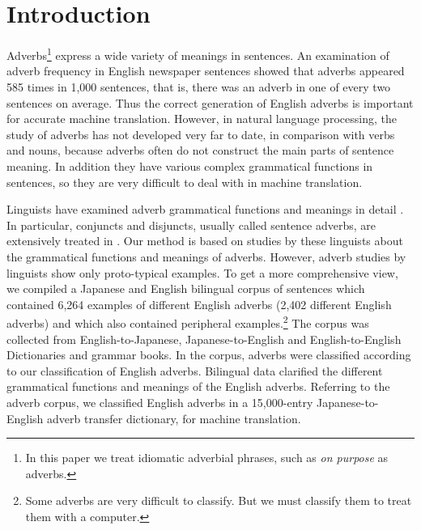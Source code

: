 

\maketitle 


\section{Introduction}
\label{sec:intr}

Adverbs\footnote{In this paper we treat idiomatic adverbial phrases,
  such as {\em on purpose} as adverbs.} express a wide variety of
meanings in sentences. An examination of adverb frequency in English
newspaper sentences showed that adverbs appeared 585 times in 1,000
sentences, that is, there was an adverb in one of every two sentences
on average.  Thus the correct generation of English adverbs is
important for accurate machine translation.  However, in natural
language processing, the study of adverbs has not developed very far
to date, in comparison with verbs and nouns, because adverbs often do not
construct the main parts of sentence meaning.
In addition they have various complex grammatical functions in
sentences, so they are very difficult to deal with in machine
translation.

Linguists have examined adverb grammatical functions and meanings in
detail \cite{Quirk:85,Otsuka:82,Rivero:92}.  In particular, conjuncts
and disjuncts, usually called sentence adverbs, are extensively
treated in .  Our method is based on studies by these
linguists about the grammatical functions and meanings of adverbs.
However, adverb studies by linguists show only proto-typical examples.
To get a more comprehensive view, we compiled a Japanese and English
bilingual corpus of sentences which contained 6,264 examples of
different English adverbs (2,402 different English adverbs) and which
also contained peripheral examples.\footnote {Some adverbs are very
difficult to classify.  But we must classify them to treat them with a
computer.} The corpus was collected from English-to-Japanese,
Japanese-to-English and English-to-English Dictionaries and grammar
books.  In the corpus, adverbs were classified according to our
classification of English adverbs. Bilingual data clarified the
different grammatical functions and meanings of the English adverbs.
Referring to the adverb corpus, we classified English adverbs in a
15,000-entry Japanese-to-English adverb transfer dictionary, for
machine translation.

